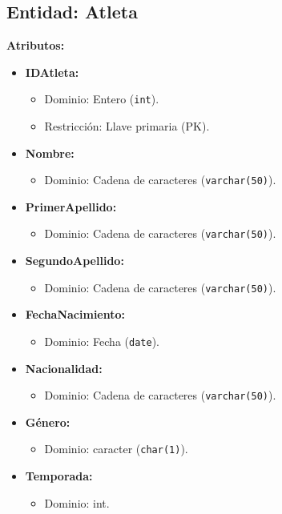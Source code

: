\subsection*{Entidad: Atleta}
\textbf{Atributos:}
\begin{itemize}
    \item \textbf{IDAtleta:}
    \begin{itemize}
        \item Dominio: Entero (\texttt{int}).
        \item Restricción: Llave primaria (PK).
    \end{itemize}
    \item \textbf{Nombre:}
    \begin{itemize}
        \item Dominio: Cadena de caracteres (\texttt{varchar(50)}).
    \end{itemize}
    \item \textbf{PrimerApellido:}
    \begin{itemize}
        \item Dominio: Cadena de caracteres (\texttt{varchar(50)}).
    \end{itemize}
    \item \textbf{SegundoApellido:}
    \begin{itemize}
        \item Dominio: Cadena de caracteres (\texttt{varchar(50)}).
    \end{itemize}
    \item \textbf{FechaNacimiento:}
    \begin{itemize}
        \item Dominio: Fecha (\texttt{date}).
    \end{itemize}
    \item \textbf{Nacionalidad:}
    \begin{itemize}
        \item Dominio: Cadena de caracteres (\texttt{varchar(50)}).
    \end{itemize}
    \item \textbf{Género:}
    \begin{itemize}
        \item Dominio: caracter (\texttt{char(1)}).
    \end{itemize}
    \item \textbf{Temporada:}
    \begin{itemize}
        \item Dominio: int.
    \end{itemize}

\end{itemize}
